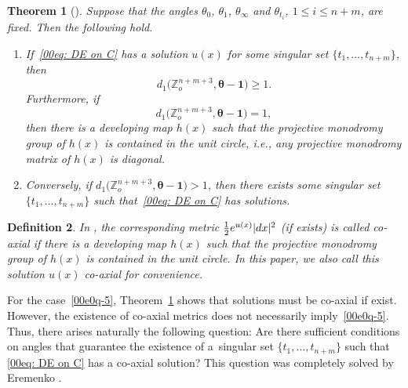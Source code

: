 \documentclass[11pt]{article}
\numberwithin{equation}{section}
\numberwithin{equation}{section}
\newtheorem{Theorem}{Theorem}[section]
\newtheorem{Definition}[Theorem]{Definition}
\def\Z{\mathbb Z}
\begin{document}
\begin{Theorem}[{\cite{Mondello-Panov}}]\label{thm-MP}
 Suppose that the angles $\theta_0$, $\theta_1$, $\theta_\infty$ and
 $\theta_{t_i}$, $1\le i\le n+m$, are fixed. Then the following
 hold.
\begin{enumerate}\itemsep=0pt
\item[$1.$]
If~\eqref{00eq: DE on C} has a solution $u(x)$ for some singular set $\{t_1,\dots,t_{n+m}\}$, then
\[d_1\bigl(\Z_o^{n+m+3},{\boldsymbol\theta-\boldsymbol 1}\bigr)\geq 1.\]
Furthermore, if
 \begin{equation}\label{00e0q-5}
d_1\bigl(\Z_o^{n+m+3},{\boldsymbol\theta-\boldsymbol 1}\bigr)=1,
\end{equation}
then there is a developing map $h(x)$ such that the projective
monodromy group of $h(x)$ is contained in the unit circle, i.e., any
projective monodromy matrix of $h(x)$ is diagonal.

\item[$2.$]
Conversely, if $d_1\bigl(\Z_o^{n+m+3},{\boldsymbol\theta-\boldsymbol 1}\bigr)>1$, then there exists some singular set $\{t_1,\dots, t_{n+m}\}$ such that~\eqref{00eq: DE on C} has solutions.
\end{enumerate}
\end{Theorem}

\begin{Definition}
In \cite{Mondello-Panov}, the corresponding metric
$\frac12{\rm e}^{u(x)}|{\rm d}x|^2$ (if exists) is called \emph{co-axial} if there
is a developing map $h(x)$ such that the projective monodromy group of
$h(x)$ is contained in the unit circle. In this paper, we also call
this solution $u(x)$ \emph{co-axial} for convenience.
\end{Definition}

For the case~\eqref{00e0q-5}, Theorem~\ref{thm-MP} shows that solutions must be
co-axial if exist. However, the existence of co-axial metrics does not
necessarily imply~\eqref{00e0q-5}. Thus, there arises naturally the
following question: Are there sufficient conditions on angles that
guarantee the existence of a~singular set $\{t_1,\dots,t_{n+m}\}$ such that
\eqref{00eq: DE on C} has a co-axial solution? This question was
completely solved by Eremenko \cite{Coaxial}.
\end{document}

